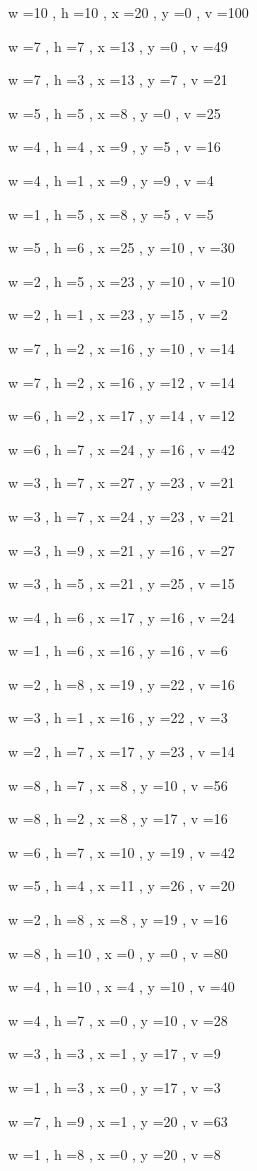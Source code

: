 \documentclass[11pt]{article}
\begin{document}
w =10 , h =10 , x =20 , y =0 , v =100
\par
w =7 , h =7 , x =13 , y =0 , v =49
\par
w =7 , h =3 , x =13 , y =7 , v =21
\par
w =5 , h =5 , x =8 , y =0 , v =25
\par
w =4 , h =4 , x =9 , y =5 , v =16
\par
w =4 , h =1 , x =9 , y =9 , v =4
\par
w =1 , h =5 , x =8 , y =5 , v =5
\par
w =5 , h =6 , x =25 , y =10 , v =30
\par
w =2 , h =5 , x =23 , y =10 , v =10
\par
w =2 , h =1 , x =23 , y =15 , v =2
\par
w =7 , h =2 , x =16 , y =10 , v =14
\par
w =7 , h =2 , x =16 , y =12 , v =14
\par
w =6 , h =2 , x =17 , y =14 , v =12
\par
w =6 , h =7 , x =24 , y =16 , v =42
\par
w =3 , h =7 , x =27 , y =23 , v =21
\par
w =3 , h =7 , x =24 , y =23 , v =21
\par
w =3 , h =9 , x =21 , y =16 , v =27
\par
w =3 , h =5 , x =21 , y =25 , v =15
\par
w =4 , h =6 , x =17 , y =16 , v =24
\par
w =1 , h =6 , x =16 , y =16 , v =6
\par
w =2 , h =8 , x =19 , y =22 , v =16
\par
w =3 , h =1 , x =16 , y =22 , v =3
\par
w =2 , h =7 , x =17 , y =23 , v =14
\par
w =8 , h =7 , x =8 , y =10 , v =56
\par
w =8 , h =2 , x =8 , y =17 , v =16
\par
w =6 , h =7 , x =10 , y =19 , v =42
\par
w =5 , h =4 , x =11 , y =26 , v =20
\par
w =2 , h =8 , x =8 , y =19 , v =16
\par
w =8 , h =10 , x =0 , y =0 , v =80
\par
w =4 , h =10 , x =4 , y =10 , v =40
\par
w =4 , h =7 , x =0 , y =10 , v =28
\par
w =3 , h =3 , x =1 , y =17 , v =9
\par
w =1 , h =3 , x =0 , y =17 , v =3
\par
w =7 , h =9 , x =1 , y =20 , v =63
\par
w =1 , h =8 , x =0 , y =20 , v =8
\par
\newpage
\end{document}
